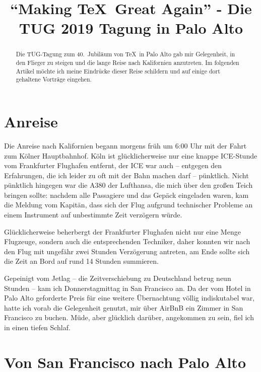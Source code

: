 \documentclass[ngerman]{dtk}
\begin{document}
\title{\enquote{Making \TeX\ Great Again} - Die TUG 2019 Tagung in Palo Alto}
\maketitle

\begin{abstract}
Die TUG-Tagung zum 40.~Jubiläum von \TeX\ in Palo Alto gab mir Gelegenheit, in den Flieger zu steigen und die lange Reise nach Kalifornien anzutreten. Im folgenden Artikel möchte ich meine Eindrücke dieser Reise schildern und auf einige dort gehaltene Vorträge eingehen.
\end{abstract}

\section{Anreise}

Die Anreise nach Kalifornien begann morgens früh um 6:00 Uhr mit der Fahrt zum Kölner Hauptbahnhof. Köln ist glücklicherweise nur eine knappe ICE-Stunde vom Frankfurter Flughafen entfernt, der ICE war auch -- entgegen den Erfahrungen, die ich leider zu oft mit der Bahn machen darf -- pünktlich. Nicht pünktlich hingegen war die A380 der Lufthansa, die mich über den großen Teich bringen sollte:  nachdem alle Passagiere und das Gepäck eingeladen waren, kam die Meldung vom Kapitän, dass sich der Flug aufgrund technischer Probleme an einem Instrument auf unbestimmte Zeit verzögern würde. 

Glücklicherweise beherbergt der Frankfurter Flughafen nicht nur eine Menge Flugzeuge, sondern auch die entsprechenden Techniker,  daher konnten wir nach den Flug mit ungefähr zwei Stunden Verzögerung antreten, am Ende  sollte  sich die Zeit an Bord auf rund 14 Stunden summieren. 

Gepeinigt vom Jetlag -- die Zeitverschiebung zu Deutschland betrug neun Stunden -- kam ich Donnerstagmittag in San Francisco an. Da der vom Hotel in Palo Alto geforderte Preis für eine weitere Übernachtung völlig indiskutabel war, hatte ich vorab die Gelegenheit genutzt, mir über AirBnB ein Zimmer in San Francisco zu buchen. Müde, aber glücklich darüber, angekommen zu sein, fiel ich in einen tiefen Schlaf.

\section{Von San Francisco nach Palo Alto}
\end{document}
